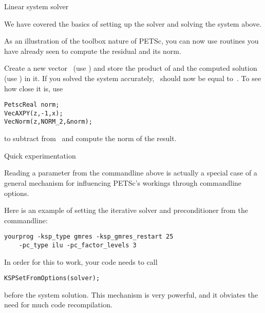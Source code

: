  {Linear system solver}

We have covered the basics of setting up the solver and solving the
system above.

As an illustration of the toolbox nature of PETSc, you can now use
routines you have already seen to compute the residual and its norm.

\begin{exercise}
  Create a new vector~ (use ) and store the
  product of  and the computed solution~ (use )
  in it. If you solved the system accurately, ~should now be
  equal to~. To see how close it is, use
\begin{verbatim}
PetscReal norm;
VecAXPY(z,-1,x);
VecNorm(z,NORM_2,&norm);
\end{verbatim}
  to subtract  from~ and compute the norm of the result.
\end{exercise}

 {Quick experimentation}

Reading a parameter from the
commandline above is actually a special case of a general mechanism
for influencing PETSc's workings through commandline options.

Here is an example of setting the iterative solver and preconditioner
from the commandline:
\begin{verbatim}
yourprog -ksp_type gmres -ksp_gmres_restart 25
    -pc_type ilu -pc_factor_levels 3
\end{verbatim}

In order for this to work, your code needs to call
\begin{verbatim}
KSPSetFromOptions(solver);
\end{verbatim}
before the system solution. This mechanism is very powerful, and it
obviates the need for much code recompilation.

